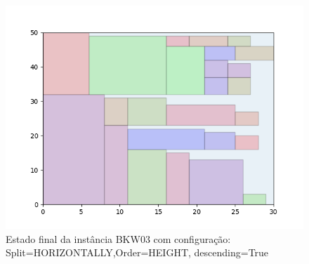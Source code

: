 \begin{figure}[H]
    \centering
    \caption[]{Estado final da instância BKW03 com configuração: Split=HORIZONTALLY,Order=HEIGHT, descending=True}
    \label{fig:bkw03-horizontally-height-true}
    \includegraphics[scale=0.5]{output/figures/bkw/bkw03/horizontally/height/true/00}
\end{figure}